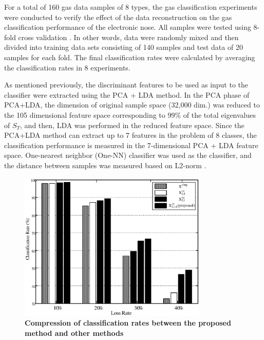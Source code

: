 \documentclass[10pt,letterpaper]{article}
\begin{document}
For a total of 160 gas data samples of 8 types, the gas classification experiments were conducted to verify the effect of the data reconstruction on the gas classification performance of the electronic nose. 
All samples were tested using 8-fold cross validation \cite{liu2009encyclopedia}. 
In other words, data were randomly mixed and then divided into training data sets consisting of 140 samples and test data of 20 samples for each fold. The final classification rates were calculated by averaging the classification rates in 8 experiments. 

As mentioned previously, the discriminant features to be used as input to the classifier were extracted using the PCA + LDA method.
In the PCA phase of PCA+LDA, the dimension of original sample space (32,000 dim.) was reduced to the 105 dimensional feature space corresponding to 99\% of the total eigenvalues of $S_T$, and then, LDA was performed in the reduced feature space. 
Since the PCA+LDA method can extract up to 7 features in the problem of 8 classes, the classification performance is measured in the 7-dimensional PCA + LDA feature space. 
One-nearest neighbor (One-NN) classifier was used as the classifier, and the distance between samples was measured based on L2-norm \cite{wang2007reconstruction}.

\begin{figure}[t]
	\centering
    \includegraphics[width=0.8\textwidth]{_11.eps}
    \caption{\bf{Compression of classification rates between the proposed method and other methods}\label{fig. 11}}
\end{figure}
\end{document}
